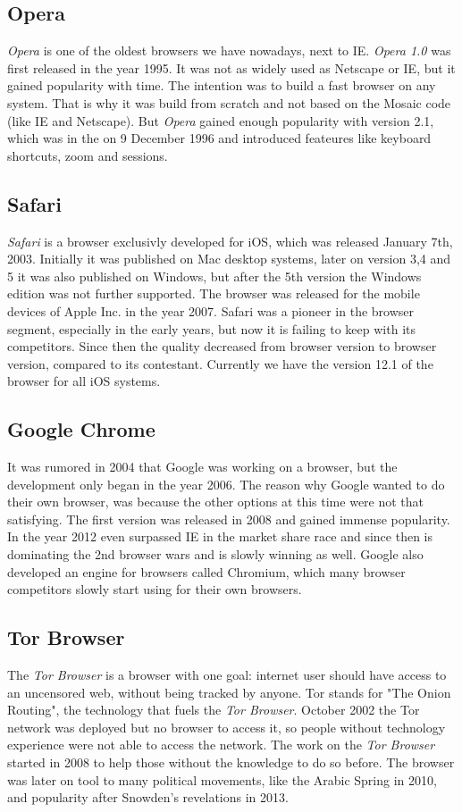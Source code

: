 \documentclass[runningheads]{llncs}
\begin{document}
		\subsection{Opera}
		\textit{Opera} is one of the oldest browsers we have nowadays, next to IE. \textit{Opera 1.0} was first released in the year 1995. It was not as widely used as Netscape or IE, but it gained popularity with time. The intention was to build a fast browser on any system. That is why it was build from scratch and not based on the Mosaic code (like IE and Netscape). But \textit{Opera} gained enough popularity with version 2.1, which was in the on 9 December 1996 and introduced feateures like keyboard shortcuts, zoom and sessions.
		\subsection{Safari}
		\textit{Safari} is a browser exclusivly developed for iOS, which was released January 7th, 2003. Initially it was published on Mac desktop systems, later on version 3,4 and 5 it was also published on Windows, but after the 5th version the Windows edition was not further supported. The browser was released for the mobile devices of Apple Inc. in the year 2007. Safari was a pioneer in the browser segment, especially in the early years, but now it is failing to keep with its competitors. Since then the quality decreased from browser version to browser version, compared to its contestant. Currently we have the version 12.1 of the browser for all iOS systems.
		\subsection{Google Chrome}
		It was rumored in 2004 that Google was working on a browser, but the development only began in the year 2006. The reason why Google wanted to do their own browser, was because the other options at this time were not that satisfying. The first version was released in 2008 and gained immense popularity. In the year 2012 even surpassed IE in the market share race and since then is dominating the 2nd browser wars and is slowly winning as well. Google also developed an engine for browsers called Chromium, which many browser competitors slowly start using for their own browsers.
		\subsection{Tor Browser}
		The \textit{Tor Browser} is a browser with one goal: internet user should have access to an uncensored web, without being tracked by anyone. Tor stands for "The Onion Routing", the technology that fuels the \textit{Tor Browser}. October 2002 the Tor network was deployed but no browser to access it, so people without technology experience were not able to access the network. The work on the \textit{Tor Browser} started in 2008 to help those without the knowledge to do so before. The browser was later on tool to many political movements, like the Arabic Spring in 2010, and popularity after Snowden's revelations in 2013.
\end{document}
